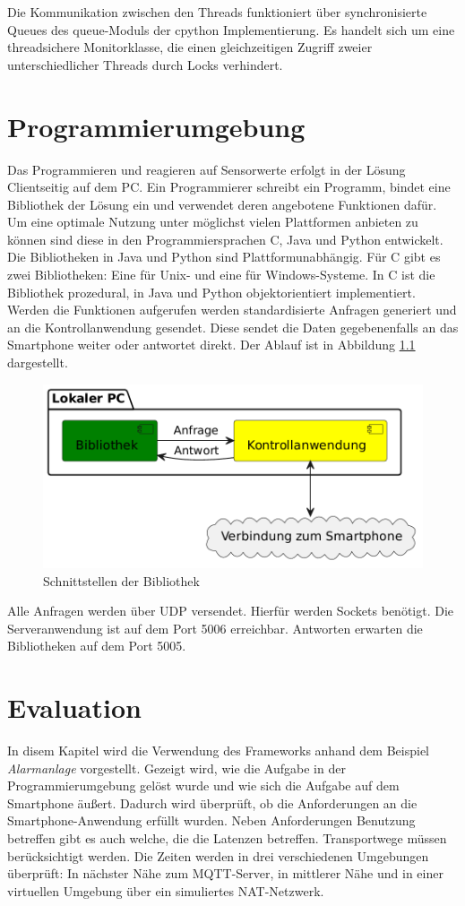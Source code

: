 \documentclass[11pt,a4paper]{report}
\begin{document}
Die Kommunikation zwischen den Threads funktioniert über synchronisierte Queues des queue-Moduls\cite{python_queue} der cpython Implementierung.
Es handelt sich um eine threadsichere Monitorklasse, die einen gleichzeitigen Zugriff zweier unterschiedlicher Threads durch Locks verhindert.

\chapter{Programmierumgebung}\label{chap:libs}
Das Programmieren und reagieren auf Sensorwerte erfolgt in der Lösung Clientseitig auf dem PC.
Ein Programmierer schreibt ein Programm, bindet eine Bibliothek der Lösung ein und verwendet deren angebotene Funktionen dafür.
Um eine optimale Nutzung unter möglichst vielen Plattformen anbieten zu können sind diese in den Programmiersprachen C, Java und Python entwickelt.
Die Bibliotheken in Java und Python sind Plattformunabhängig.
Für C gibt es zwei Bibliotheken: Eine für Unix- und eine für Windows-Systeme.
In C ist die Bibliothek prozedural, in Java und Python objektorientiert implementiert.
Werden die Funktionen aufgerufen werden standardisierte Anfragen generiert und an die Kontrollanwendung gesendet.
Diese sendet die Daten gegebenenfalls an das Smartphone weiter oder antwortet direkt.
Der Ablauf ist in Abbildung \ref{fig:Schnittstelle Bibliothek} dargestellt.
\begin{figure}[htbp]
  \centering
  \includegraphics[width=.8\textwidth]{images/lib_server_connection}
  \caption{Schnittstellen der Bibliothek}
  \label{fig:Schnittstelle Bibliothek}
\end{figure}
Alle Anfragen werden über UDP versendet.
Hierfür werden Sockets benötigt.
Die Serveranwendung ist auf dem Port 5006 erreichbar.
Antworten erwarten die Bibliotheken auf dem Port 5005.


\chapter{Evaluation}\label{chap:eval}
In disem Kapitel wird die Verwendung des Frameworks anhand dem Beispiel \textit{Alarmanlage} vorgestellt.
Gezeigt wird, wie die Aufgabe in der Programmierumgebung gelöst wurde und wie sich die Aufgabe auf dem Smartphone äußert.
Dadurch wird überprüft, ob die Anforderungen an die Smartphone-Anwendung erfüllt wurden.
Neben Anforderungen Benutzung betreffen gibt es auch welche, die die Latenzen betreffen.
Transportwege müssen berücksichtigt werden.
Die Zeiten werden in drei verschiedenen Umgebungen überprüft: In nächster Nähe zum MQTT-Server, in mittlerer Nähe und in einer virtuellen Umgebung über ein simuliertes NAT-Netzwerk.
\end{document}

